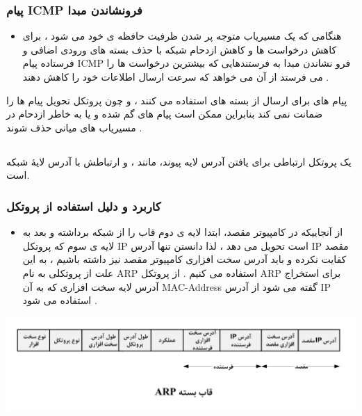\documentclass[12pt]{book}
\begin{document}
\subsubsection{
پیام ICMP فرونشاندن مبدا 
}

\begin{itemize}
	\item هنگامی که یک مسیریاب متوجه پر شدن ظرفیت حافظه ی خود می شود ، برای کاهش درخواست ها و کاهش ازدحام شبکه با حذف بسته های ورودی اضافی و فرستاده پیام ICMP فرو نشاندن مبدا به فرستندهایی که بیشترین درخواست ها را می فرستد از آن می خواهد که سرعت ارسال اطلاعات خود را کاهش دهند .
\end{itemize}




پیام های 
برای ارسال 
از بسته های 
استفاده می کنند 
، و چون پروتکل 
تحویل پیام ها را ضمانت نمی کند بنابراین ممکن است پیام های 
گم شده و یا به خاطر ازدحام در مسیریاب های میانی حذف شوند .



\subsection{}

یک پروتکل ارتباطی برای یافتن آدرس لایه پیوند، مانند 
 ، و ارتباطش با آدرس لایهٔ شبکه
است.


\subsubsection{ کاربرد و دلیل استفاده از پروتکل  }

\begin{itemize}
	\item از آنجاییکه در کامپیوتر مقصد، ابتدا لایه ی دوم قاب را از شبکه برداشته و بعد به لایه ی سوم که پروتکل IP 
	است تحویل می دهد ، لذا دانستن تنها آدرس IP مقصد کفایت نکرده و باید آدرس سخت افزاری کامپیوتر مقصد نیز داشته باشیم ، به این علت از پروتکلی به نام ARP استفاده می کنیم . 
	از پروتکل ARP 
	برای استخراج آدرس لایه سخت افزاری که به آن
	MAC-Address
	گفته می شود از آدرس IP استفاده می شود .
\end{itemize}


\begin{center}
	\includegraphics[scale=0.5]{./arp_1.png}
\end{center}
\end{document}
